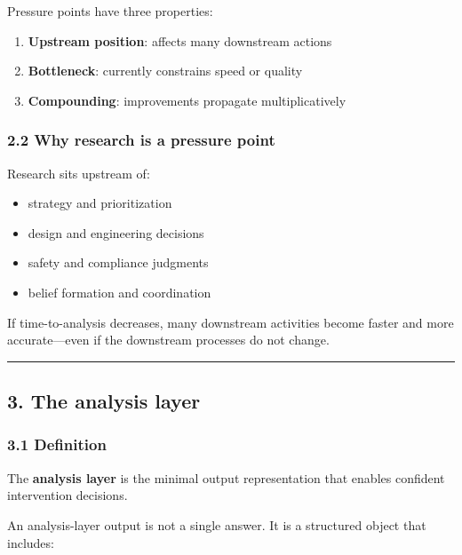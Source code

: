 \documentclass[11pt]{article}
\providecommand{\tightlist}{%
  \setlength{\itemsep}{0pt}\setlength{\parskip}{0pt}}
\begin{document}
Pressure points have three properties:

\begin{enumerate}
\def\labelenumi{\arabic{enumi})}
\tightlist
\item
  \textbf{Upstream position}: affects many downstream actions
\item
  \textbf{Bottleneck}: currently constrains speed or quality
\item
  \textbf{Compounding}: improvements propagate multiplicatively
\end{enumerate}

\hypertarget{why-research-is-a-pressure-point}{%
\subsubsection{2.2 Why research is a pressure
point}\label{why-research-is-a-pressure-point}}

Research sits upstream of:

\begin{itemize}
\tightlist
\item
  strategy and prioritization
\item
  design and engineering decisions
\item
  safety and compliance judgments
\item
  belief formation and coordination
\end{itemize}

If time-to-analysis decreases, many downstream activities become faster
and more accurate---even if the downstream processes do not change.

\begin{center}\rule{0.5\linewidth}{0.5pt}\end{center}

\hypertarget{the-analysis-layer}{%
\subsection{3. The analysis layer}\label{the-analysis-layer}}

\hypertarget{definition-1}{%
\subsubsection{3.1 Definition}\label{definition-1}}

The \textbf{analysis layer} is the minimal output representation that
enables confident intervention decisions.

An analysis-layer output is not a single answer. It is a structured
object that includes:
\end{document}
